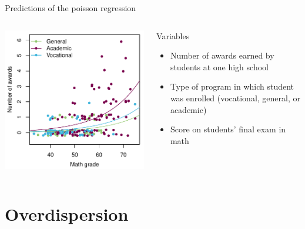 \documentclass[aspectratio=169]{beamer}
\begin{document}
\begin{frame}{Predictions of the poisson regression}
\begin{columns}[c]
\begin{column}{6cm}
  \includegraphics[scale=.7]{../figures/pois_pre}
\end{column}
\begin{column}{5cm}
  Variables
  \begin{itemize}
    \item Number of awards earned by students at one high school
    \item Type of program in which student was enrolled (vocational,
    general, or academic)
    \item Score on students' final exam in math
  \end{itemize}
\end{column}
\end{columns}
\end{frame}

\section{Overdispersion}
\end{document}
